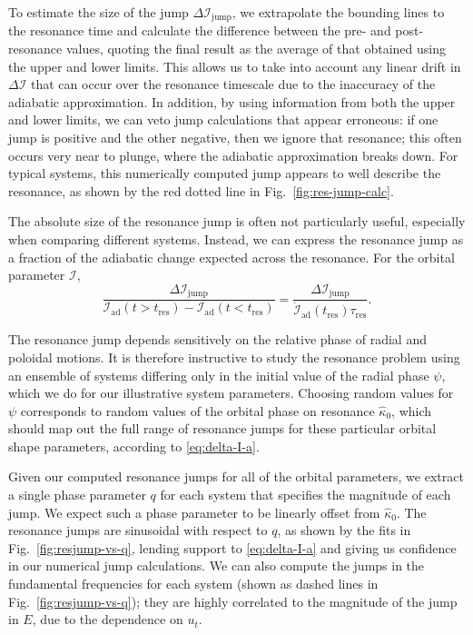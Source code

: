 \documentclass[aps,prd,amsfonts,amssymb,amsmath,nofootinbib,reprint,showpacs]{revtex4}
\newcommand{\figref}[1]{Fig.\ \ref{fig:#1}}
\begin{document}
To estimate the size of the jump $\Delta \mathcal{I}_{\mathrm{jump}}$, we extrapolate the bounding lines to the resonance time and calculate the difference between the pre- and post-resonance values, quoting the final result as the average of that obtained using the upper and lower limits. This allows us to take into account any linear drift in $\Delta \mathcal{I}$ that can occur over the resonance timescale due to the inaccuracy of the adiabatic approximation. In addition, by using information from both the upper and lower limits, we can veto jump calculations that appear erroneous: if one jump is positive and the other negative, then we ignore that resonance; this often occurs very near to plunge, where the adiabatic approximation breaks down. For typical systems, this numerically computed jump appears to well describe the resonance, as shown by the red dotted line in \figref{res-jump-calc}.

The absolute size of the resonance jump is often not particularly useful, especially when comparing different systems. Instead, we can express the resonance jump as a fraction of the adiabatic change expected across the resonance. For the orbital parameter $\mathcal{I}$,
\begin{equation}
\label{eq:res-jump-ratio}
\frac{\Delta \mathcal{I}_\mathrm{jump}}{\mathcal{I}_\mathrm{ad}(t>t_\mathrm{res})-\mathcal{I}_\mathrm{ad}(t<t_\mathrm{res})} = \frac{\Delta \mathcal{I}_\mathrm{jump}}{\dot{\mathcal{I}}_\mathrm{ad}(t_\mathrm{res})\tau_\mathrm{res}}.
\end{equation}

The resonance jump depends sensitively on the relative phase of radial and poloidal motions. It is therefore instructive to study the resonance problem using an ensemble of systems differing only in the initial value of the radial phase $\psi$, which we do for our illustrative system parameters. Choosing random values for $\psi$ corresponds to random values of the orbital phase on resonance $\widehat{\kappa}_0$, which should map out the full range of resonance jumps for these particular orbital shape parameters, according to \eqref{eq:delta-I-a}.

Given our computed resonance jumps for all of the orbital parameters, we extract a single phase parameter $q$ for each system that specifies the magnitude of each jump. We expect such a phase parameter to be linearly offset from $\widehat{\kappa}_0$. The resonance jumps are sinusoidal with respect to $q$, as shown by the fits in \figref{resjump-vs-q}, lending support to \eqref{eq:delta-I-a} and giving us confidence in our numerical jump calculations. We can also compute the jumps in the fundamental frequencies for each system (shown as dashed lines in \figref{resjump-vs-q}); they are highly correlated to the magnitude of the jump in $E$, due to the dependence on $u_t$.
\end{document}

